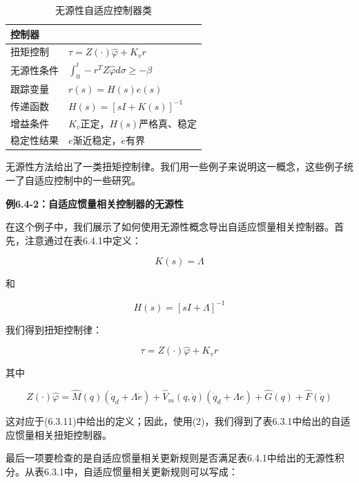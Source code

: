 \documentclass[12pt,a4paper]{ctexart}
\begin{document}
\begin{table}[H]
\centering
\caption{无源性自适应控制器类}
\begin{tabular}{|l|l|}
\hline
\textbf{控制器} & \\ \hline
扭矩控制 & $\tau = Z(\cdot)\hat{\varphi} + K_v r$ \\ \hline
无源性条件 & $\int_0^t -r^T Z \hat{\varphi} d\sigma \geq -\beta$ \\ \hline
跟踪变量 & $r(s) = H(s)e(s)$ \\ \hline
传递函数 & $H(s) = [sI + K(s)]^{-1}$ \\ \hline
增益条件 & $K_v$正定，$H(s)$严格真、稳定 \\ \hline
稳定性结果 & $e$渐近稳定，$\dot{e}$有界 \\ \hline
\end{tabular}
\end{table}

无源性方法给出了一类扭矩控制律。我们用一些例子来说明这一概念，这些例子统一了自适应控制中的一些研究。

\textbf{例6.4-2：自适应惯量相关控制器的无源性}

在这个例子中，我们展示了如何使用无源性概念导出自适应惯量相关控制器。首先，注意通过在表6.4.1中定义：

\begin{equation}
K(s) = \Lambda
\end{equation}

和

\begin{equation}
H(s) = [sI + \Lambda]^{-1}
\end{equation}

我们得到扭矩控制律：

\begin{equation}
\tau = Z(\cdot)\hat{\varphi} + K_v r
\end{equation}

其中

\begin{equation}
Z(\cdot)\hat{\varphi} = \hat{M}(q)(\ddot{q}_d + \Lambda \dot{e}) + \hat{V}_m(q, \dot{q})(\dot{q}_d + \Lambda e) + \hat{G}(q) + \hat{F}(\dot{q})
\end{equation}

这对应于(6.3.11)中给出的定义；因此，使用(2)，我们得到了表6.3.1中给出的自适应惯量相关扭矩控制器。

最后一项要检查的是自适应惯量相关更新规则是否满足表6.4.1中给出的无源性积分。从表6.3.1中，自适应惯量相关更新规则可以写成：
\end{document}
